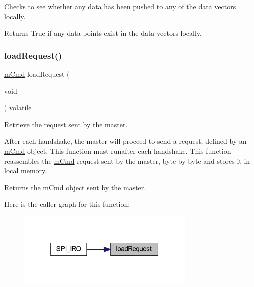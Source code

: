 Checks to see whether any data has been pushed to any of the data vectors locally. 

\begin{DoxyReturn}{Returns}
True if any data points exist in the data vectors locally. 
\end{DoxyReturn}
\mbox{\label{class_master_a3a3fce38be9020bb12ab595c4adc59ed}} 
\subsubsection{\texorpdfstring{loadRequest()}{loadRequest()}}
{\footnotesize\ttfamily \mbox{\hyperlink{structm_cmd}{m\+Cmd}} load\+Request (\begin{DoxyParamCaption}\item[{void}]{ }\end{DoxyParamCaption}) volatile}



Retrieve the request sent by the master. 

After each handshake, the master will proceed to send a request, defined by an \mbox{\hyperlink{structm_cmd}{m\+Cmd}} object. This function must runafter each handshake. This function reassembles the \mbox{\hyperlink{structm_cmd}{m\+Cmd}} request sent by the master, byte by byte and stores it in local memory. \begin{DoxyReturn}{Returns}
the \mbox{\hyperlink{structm_cmd}{m\+Cmd}} object sent by the master. 
\end{DoxyReturn}
Here is the caller graph for this function\+:
\nopagebreak
\begin{figure}[H]
\begin{center}
\leavevmode
\includegraphics[width=241pt]{class_master_a3a3fce38be9020bb12ab595c4adc59ed_icgraph}
\end{center}
\end{figure}
\mbox{\label{class_master_a54259c8db640b88dcf5de5594a947b1c}} 
